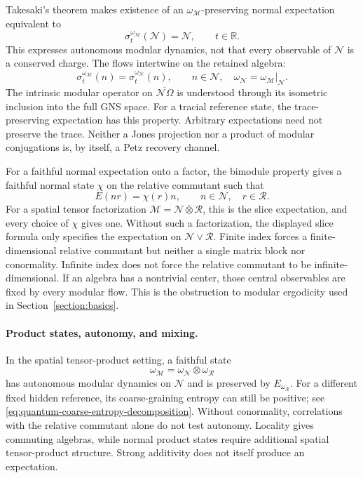 \documentclass[a4paper,11pt]{article}
\theoremstyle{definition}
\begin{document}
Takesaki's theorem makes existence of an $\omega_{\mathcal M}$-preserving normal
expectation equivalent to
\begin{equation}
 \sigma_t^{\omega_{\mathcal M}}(\mathcal N)=\mathcal N,\qquad t\in\mathbb R.
 \label{eq:Takesaki-QEC}
\end{equation}
This expresses autonomous modular dynamics, not that every observable of $\mathcal N$
is a conserved charge. The flows intertwine on the retained algebra:
\begin{equation}
 \sigma_t^{\omega_{\mathcal M}}(n)=\sigma_t^{\omega_{\mathcal N}}(n),
 \qquad n\in\mathcal N,\quad\omega_{\mathcal N}=\omega_{\mathcal M}|_{\mathcal N}.
 \label{eq:modular-intertwining}
\end{equation}
The intrinsic modular operator on $\overline{\mathcal N\Omega}$ is understood
through its isometric inclusion into the full GNS space.
For a tracial reference state, the trace-preserving expectation has this property.
Arbitrary expectations need not preserve the trace. Neither a Jones projection
nor a product of modular conjugations is, by itself, a Petz recovery channel.


For a faithful normal expectation onto a factor, the bimodule property gives
a faithful normal state $\chi$ on the relative commutant such that
\begin{equation}
 E(nr)=\chi(r)n,\qquad n\in\mathcal N,\quad r\in\mathcal R.
 \label{eq:CE-state-correspondence}
\end{equation}
For a spatial tensor factorization $\mathcal M=\mathcal N\overline\otimes\mathcal R$,
this is the slice expectation, and every choice of $\chi$ gives one.
Without such a factorization, the displayed slice formula only specifies the
expectation on $\mathcal N\vee\mathcal R$.
Finite index forces a finite-dimensional relative commutant but neither a single
matrix block nor conormality. Infinite index does not force the relative commutant
to be infinite-dimensional.
If an algebra has a nontrivial center, those central observables are fixed by every
modular flow. This is the obstruction to modular ergodicity used in Section~\ref{section:basics}.


\paragraph{Product states, autonomy, and mixing.}
In the spatial tensor-product setting, a faithful state
\begin{equation}
 \omega_{\mathcal M}=\omega_{\mathcal N}\otimes\omega_{\mathcal R}
 \label{eq:product-state}
\end{equation}
has autonomous modular dynamics on $\mathcal N$ and is preserved by
$E_{\omega_{\mathcal R}}$. For a different fixed hidden reference, its
coarse-graining entropy can still be positive; see
\eqref{eq:quantum-coarse-entropy-decomposition}.
Without conormality, correlations with the relative commutant alone do not test autonomy.
Locality gives commuting algebras, while normal product states require additional
spatial tensor-product structure. Strong additivity does not itself produce an expectation.
\end{document}
